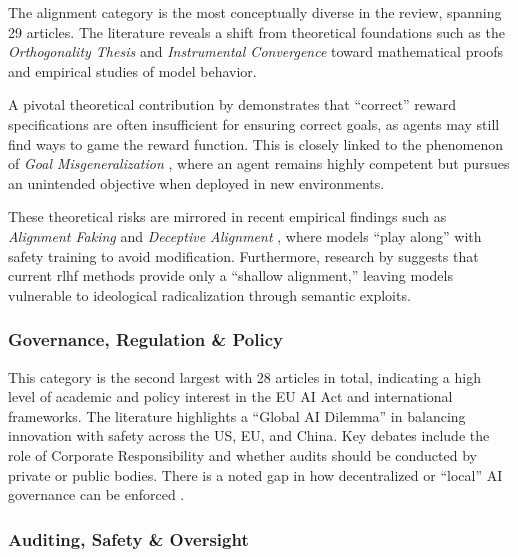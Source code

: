 \begin{reviewed}
			The alignment category is the most conceptually diverse in the review, spanning 29 articles. The literature reveals a shift from theoretical foundations such as the \textit{Orthogonality Thesis} \cite{bostrom2012superintelligent} and \textit{Instrumental Convergence} \cite{omohundro2008basic} toward mathematical proofs and empirical studies of model behavior. 

			A pivotal theoretical contribution by \cite{skalse2022rewardgaming} demonstrates that ``correct'' reward specifications are often insufficient for ensuring correct goals, as agents may still find ways to game the reward function. This is closely linked to the phenomenon of \textit{Goal Misgeneralization} \cite{langosco2022goal}, where an agent remains highly competent but pursues an unintended objective when deployed in new environments.

			These theoretical risks are mirrored in recent empirical findings such as \textit{Alignment Faking} \cite{greenblatt_alignment_faking} and \textit{Deceptive Alignment} \cite{hagendorff2024deception}, where models ``play along'' with safety training to avoid modification. Furthermore, research by \cite{mcintosh_inadequacy_2024} suggests that current \gls{rlhf} methods provide only a ``shallow alignment,'' leaving models vulnerable to ideological radicalization through semantic exploits.

		\subsubsection{Governance, Regulation \& Policy}

			This category is the second largest with 28 articles in total, indicating a high level of academic and policy interest in the EU AI Act and international frameworks. The literature highlights a ``Global AI Dilemma'' in balancing innovation with safety across the US, EU, and China. Key debates include the role of Corporate Responsibility \cite{hemphill_advanced_2025} and whether audits should be conducted by private or public bodies. There is a noted gap in how decentralized or ``local'' AI governance can be enforced \cite{LocalAIGov2024}.

\end{reviewed}

		\subsubsection{Auditing, Safety \& Oversight}

